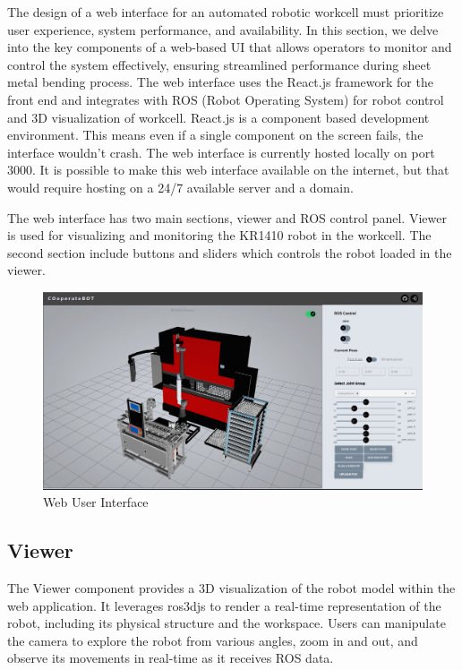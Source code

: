 The design of a web interface for an automated robotic workcell must prioritize user experience, system performance, and availability. In this section, we delve into the key components of a web-based UI that allows operators to monitor and control the system effectively, ensuring streamlined performance during sheet metal bending process. The web interface uses the React.js framework for the front end and integrates with ROS (Robot Operating System) for robot control and 3D visualization of workcell. React.js is a component based development environment. This means even if a single component on the screen fails, the interface wouldn't crash. The web interface is currently hosted locally on port 3000. It is possible to make this web interface available on the internet, but that would require hosting on a 24/7 available server and a domain.


The web interface has two main sections, viewer and ROS control panel. Viewer is used for visualizing and monitoring the KR1410 robot in the workcell. The second section include buttons and sliders which controls the robot loaded in the viewer.

\begin{figure}[h]
    \centering
    \includegraphics[width=1\textwidth]{figures/webui/webui0.png}
    \caption{Web User Interface}
    \label{fig:web-ui}
\end{figure}

\subsection{Viewer}
\label{subsec:web-ui-viewer}
The Viewer component provides a 3D visualization of the robot model within the web application. It leverages ros3djs to render a real-time representation of the robot, including its physical structure and the workspace. Users can manipulate the camera to explore the robot from various angles, zoom in and out, and observe its movements in real-time as it receives ROS data.

